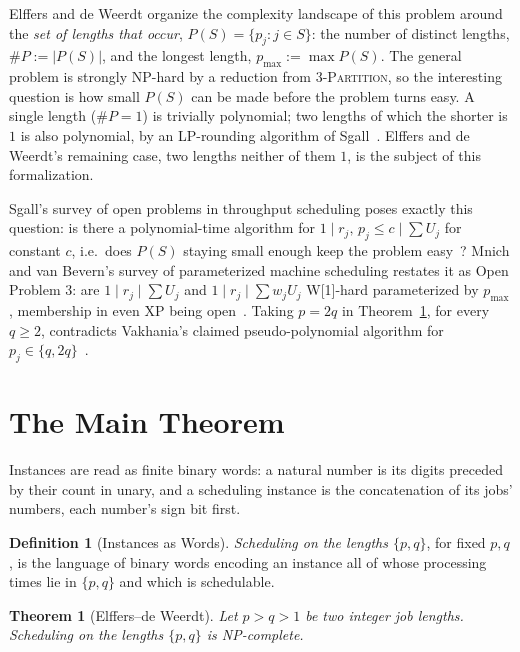 \documentclass[11pt,a4paper]{article}
\newtheorem{theorem}{Theorem}
\theoremstyle{definition}
\newtheorem{definition}{Definition}
\newcommand{\pmax}{p_{\max}}
\newcommand{\phash}{\#P}
\newcommand{\NP}{\textnormal{\textsf{NP}}}
\begin{document}
Elffers and de Weerdt organize the complexity landscape of this problem
around the \emph{set of lengths that occur}, $P(S)=\{p_j : j\in S\}$: the
number of distinct lengths, $\phash:=|P(S)|$, and the longest length,
$\pmax:=\max P(S)$. The general problem is strongly NP-hard by a reduction
from \textsc{3-Partition}, so the interesting question is how small $P(S)$
can be made before the problem turns easy. A single length ($\phash=1$) is
trivially polynomial; two lengths of which the shorter is $1$ is also
polynomial, by an LP-rounding algorithm of Sgall~\cite{Sgall12}. Elffers and
de Weerdt's remaining case, two lengths neither of them $1$, is the subject
of this formalization.

Sgall's survey of open problems in throughput scheduling poses exactly this
question: is there a polynomial-time algorithm for $1\mid r_j,\,p_j\le
c\mid\sum U_j$ for constant $c$, i.e.\ does $P(S)$ staying small enough keep
the problem easy~\cite{Sgall12}? Mnich and van Bevern's survey of
parameterized machine scheduling restates it as Open Problem 3: are
$1\mid r_j\mid\sum U_j$ and $1\mid r_j\mid\sum w_jU_j$
\textnormal{\textsf{W[1]}}-hard parameterized by $\pmax$, membership in even
\textnormal{\textsf{XP}} being open~\cite{Mnich18}. Taking $p=2q$ in
Theorem~\ref{thm:main}, for every $q\ge 2$, contradicts Vakhania's claimed
pseudo-polynomial algorithm for $p_j\in\{q,2q\}$~\cite{Vakhania04}.

\section{The Main Theorem}

Instances are read as finite binary words: a natural number is its digits
preceded by their count in unary, and a scheduling instance is the
concatenation of its jobs' numbers, each number's sign bit first.

\begin{definition}[Instances as Words]
\label{def:encoding}
\emph{Scheduling on the lengths $\{p,q\}$}, for fixed $p,q$, is the language
of binary words encoding an instance all of whose processing times lie in
$\{p,q\}$ and which is schedulable.
\end{definition}

\begin{theorem}[Elffers--de Weerdt]
\label{thm:main}
Let $p>q>1$ be two integer job lengths. Scheduling on the lengths $\{p,q\}$
is \NP-complete.
\end{theorem}
\end{document}
